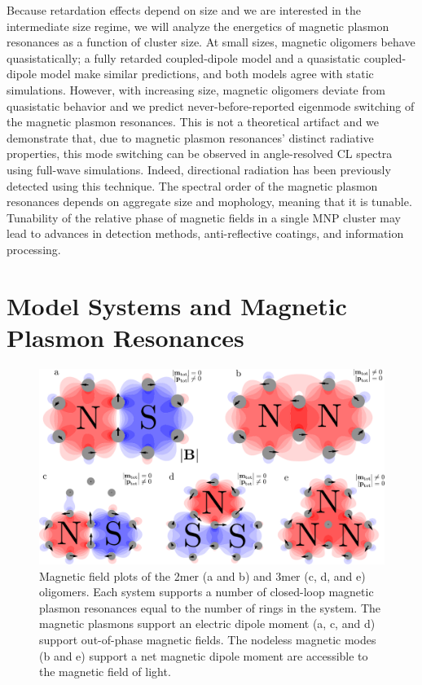 \documentclass[journal=apchd5,manuscript=article]{achemso}
\begin{document}
Because retardation effects depend on size and we are interested in the intermediate size regime, we will analyze the energetics of magnetic plasmon resonances as a function of cluster size. At small sizes, magnetic oligomers behave quasistatically; a fully retarded coupled-dipole model and a quasistatic coupled-dipole model make similar predictions, and both models agree with static simulations. However, with increasing size, magnetic oligomers deviate from quasistatic behavior and we predict never-before-reported eigenmode switching of the magnetic plasmon resonances. This is not a theoretical artifact and we demonstrate that, due to magnetic plasmon resonances' distinct radiative properties, this mode switching can be observed in angle-resolved CL spectra using full-wave simulations\cite{Hohenester2012}. Indeed, directional radiation has been previously detected using this technique\cite{Coenen2011,CoPol2011,Polman2014}. The spectral order of the magnetic plasmon resonances depends on aggregate size and mophology, meaning that it is tunable. Tunability of the relative phase of magnetic fields in a single MNP cluster may lead to advances in detection methods, anti-reflective coatings, and information processing\cite{Zia2010trans,Noginova2008trans,Wang:13,Fan2015,Wei2015,Shvets2012,Altug2012bio,Nord2011fano,Zhang2006,NordHal2011,NordHal2012}.

\section{Model Systems and Magnetic Plasmon Resonances}

\begin{figure}
\includegraphics[width=6.5in]{2mer_3mer_fields.pdf}
\caption{Magnetic field plots of the 2mer (a and b) and 3mer (c, d, and e) oligomers. Each system supports a number of closed-loop magnetic plasmon resonances equal to the number of rings in the system. The magnetic plasmons support an electric dipole moment (a, c, and d) support out-of-phase magnetic fields. The nodeless magnetic modes (b and e) support a net magnetic dipole moment are accessible to the magnetic field of light.}
\label{field_plots}
\end{figure}
\end{document}
